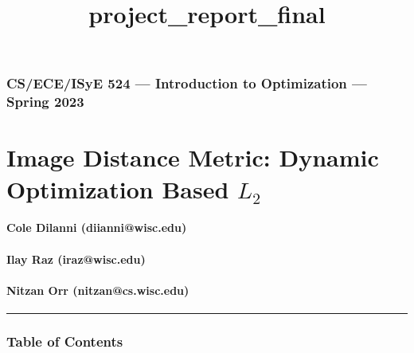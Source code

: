 \documentclass[11pt]{article}
\title{project\_report\_final}
\begin{document}
    
    \maketitle
    
    

    
    \hypertarget{cseceisye-524-introduction-to-optimization-spring-2023}{%
\subsubsection{CS/ECE/ISyE 524 --- Introduction to Optimization ---
Spring
2023}\label{cseceisye-524-introduction-to-optimization-spring-2023}}

\hypertarget{image-distance-metric-dynamic-optimization-based-l_2}{%
\section{\texorpdfstring{Image Distance Metric: Dynamic Optimization
Based
\(L_2\)}{Image Distance Metric: Dynamic Optimization Based L\_2}}\label{image-distance-metric-dynamic-optimization-based-l_2}}

\hypertarget{cole-dilanni-diianniwisc.edu}{%
\paragraph{Cole Dilanni
(diianni@wisc.edu)}\label{cole-dilanni-diianniwisc.edu}}

\hypertarget{ilay-raz-irazwisc.edu}{%
\paragraph{Ilay Raz (iraz@wisc.edu)}\label{ilay-raz-irazwisc.edu}}

\hypertarget{nitzan-orr-nitzancs.wisc.edu}{%
\paragraph{Nitzan Orr
(nitzan@cs.wisc.edu)}\label{nitzan-orr-nitzancs.wisc.edu}}

\begin{center}\rule{0.5\linewidth}{0.5pt}\end{center}

\hypertarget{table-of-contents}{%
\subsubsection{Table of Contents}\label{table-of-contents}}
\end{document}
